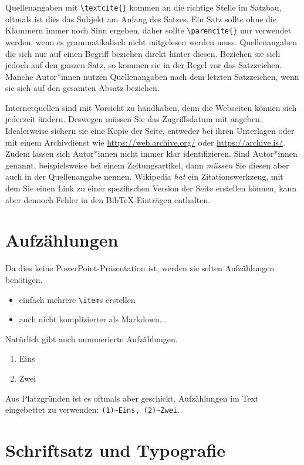 Quellenangaben mit \texttt{\textbackslash{}textcite\{\}} kommen an die richtige
Stelle im Satzbau, oftmals ist dies das Subjekt am Anfang des Satzes.
Ein Satz sollte ohne die Klammern immer noch Sinn ergeben, daher sollte
\texttt{\textbackslash{}parencite\{\}} nur verwendet werden, wenn es grammatikalisch nicht mitgelesen werden muss.
Quellenangaben die sich nur auf einen Begriff beziehen direkt hinter diesen.
Beziehen sie sich jedoch auf den ganzen Satz, so kommen sie in der Regel vor das Satzzeichen.
Manche Autor*innen nutzen Quellenangaben nach dem letzten Satzzeichen, wenn sie sich auf den gesamten Absatz beziehen.

Internetquellen sind mit Vorsicht zu handhaben, denn die Webseiten können sich jederzeit ändern.
Deswegen müssen Sie das Zugriffsdatum mit angeben. Idealerweise sichern sie eine Kopie der Seite,
entweder bei ihren Unterlagen oder mit einem Archivdienst wie \url{https://web.archive.org/} oder \url{https://archive.is/}.
Zudem lassen sich Autor*innen nicht immer klar identifizieren. Sind Autor*innen genannt, beispielsweise bei einem Zeitungsartikel,
dann \emph{müssen} Sie diesen aber auch in der Quellenangabe nennen.
Wikipedia \emph{hat} ein Zitationswerkzeug, mit dem Sie einen Link zu einer spezifischen Version der Seite erstellen können,
kann aber dennoch Fehler in den BibTeX-Einträgen enthalten.

\section{Aufzählungen}

Da dies keine PowerPoint-Präsentation ist, werden sie selten Aufzählungen benötigen.
\begin{itemize}
\item einfach mehrere \texttt{\textbackslash{}item}s erstellen
\item auch nicht komplizierter als Markdown...
\end{itemize}

\noindent %
Natürlich gibt auch nummerierte Aufzählungen.
\begin{enumerate}
\item Eins
\item Zwei
\end{enumerate}

Aus Platzgründen ist es oftmals aber geschickt, Aufzählungen im Text eingebettet zu verwenden: \texttt{(1)\textasciitilde Eins, (2)\textasciitilde Zwei}.

\section{Schriftsatz und Typografie}

